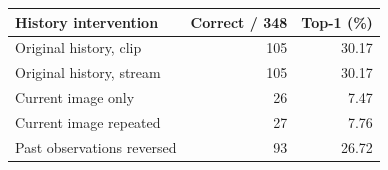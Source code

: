 \begin{tabular}{lrr}
\hline
History intervention & Correct / 348 & Top-1 (\%) \\
\hline
Original history, clip & 105 & 30.17 \\
Original history, stream & 105 & 30.17 \\
Current image only & 26 & 7.47 \\
Current image repeated & 27 & 7.76 \\
Past observations reversed & 93 & 26.72 \\
\hline
\end{tabular}

